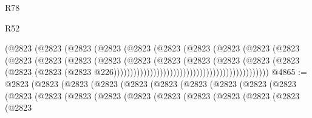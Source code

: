 \begin{lexlean}{R78}
\begin{lexlean}{R52}
\begin{coremodule}
{{{{{{{{{{{{{{{{{{{{{{{{{{{{{{{{{{{{{{{{{{{{{{{{{{{{{{{{{{{{{{{{{{{{{{{{{{{{{{{{{{{{{{{{{{{{{{{{{{{{{{{{{{{{{{{{{{{{{{{{{{{{{{{{{{{{{{{{{{{{{{{{{{{{{{{{{{{{{{{{{{{{{{{{{{{{{{{{{{{{{{{{{{{{{{{{{{{{{{                                                    (@2823
                                                      (@2823
                                                        (@2823
                                                          (@2823
                                                            (@2823
                                                              (@2823
                                                                (@2823
                                                                  (@2823
                                                                    (@2823
                                                                      (@2823
                                                                        (@2823
                                                                          (@2823
                                                                            (@2823
                                                                              (@2823
                                                                                (@2823
                                                                                  (@2823
                                                                                    (@2823
                                                                                      (@2823
                                                                                        (@2823
                                                                                          (@2823
                                                                                            (@2823
                                                                                              (@2823
                                                                                                (@2823
                                                                                                  @226)))))))))))))))))))))))))))))))))))))))))))))))
@4865 := @2823
    (@2823
      (@2823
        (@2823
          (@2823
            (@2823
              (@2823
                (@2823
                  (@2823
                    (@2823
                      (@2823
                        (@2823
                          (@2823
                            (@2823
                              (@2823
                                (@2823
                                  (@2823
                                    (@2823
                                      (@2823
                                        (@2823
                                          (@2823
}}}}}}}}}}}}}}}}}}}}}}}}}}}}}}}}}}}}}}}}}}}}}}}}}}}}}}}}}}}}}}}}}}}}}}}}}}}}}}}}}}}}}}}}}}}}}}}}}}}}}}}}}}}}}}}}}}}}}}}}}}}}}}}}}}}}}}}}}}}}}}}}}}}}}}}}}}}}}}}}}}}}}}}}}}}}}}}}}}}}}}}}}}}}}}}}}}}}}}
\end{coremodule}
\end{lexlean}
\end{lexlean}
